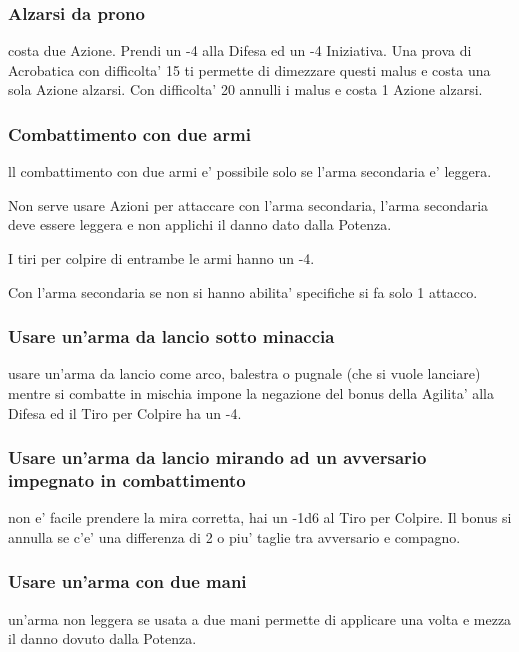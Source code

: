 \documentclass[a4paper,11pt,twoside,openany]{book}
\begin{document}
	\subsubsection{Alzarsi da prono} costa due Azione. Prendi un -4 alla Difesa ed un -4 Iniziativa. Una prova di Acrobatica con difficolta' 15 ti permette di dimezzare questi malus e costa una sola Azione alzarsi. Con difficolta' 20 annulli i malus e costa 1 Azione alzarsi.
	
	\subsubsection{Combattimento con due armi} ll combattimento con due armi e' possibile solo se l'arma secondaria e' leggera.
	
	Non serve usare Azioni per attaccare con l'arma secondaria, l'arma secondaria deve essere leggera e non applichi il danno dato dalla Potenza.
	
	I tiri per colpire di entrambe le armi hanno un -4.
	
	Con l'arma secondaria se non si hanno abilita' specifiche si fa solo 1 attacco.
	
	\subsubsection{Usare un'arma da lancio sotto minaccia} usare un'arma da lancio come arco, balestra o pugnale (che si vuole lanciare) mentre si combatte in mischia impone la negazione del bonus della Agilita' alla Difesa ed il Tiro per Colpire ha un -4.
	
	\subsubsection{Usare un'arma da lancio mirando ad un avversario impegnato
		in combattimento} non e' facile prendere la mira corretta, hai un -1d6 al Tiro per Colpire. Il bonus si annulla se c'e' una differenza di 2 o piu' taglie tra avversario e compagno.
	
	\subsubsection{Usare un'arma con due mani} un'arma non leggera se usata a due mani permette di applicare una volta e mezza il danno dovuto dalla Potenza.
	
\end{document}

